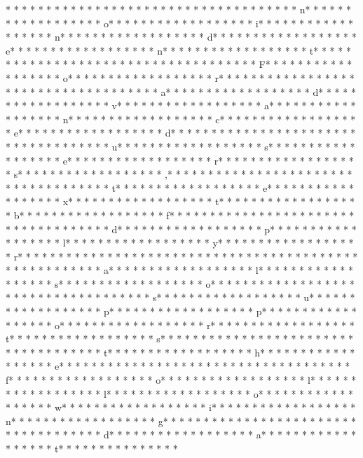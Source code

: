 * * *  * * *  * * *  *  * * *  *  * * *  * 	* * *  * * *  * * *  *  * * *  *  * * *  * n* * *  * * *  * * *  *  * * *  *  * * *  * o* * *  * * *  * * *  *  * * *  *  * * *  * i* * *  * * *  * * *  *  * * *  *  * * *  * n* * *  * * *  * * *  *  * * *  *  * * *  * d* * *  * * *  * * *  *  * * *  *  * * *  * e* * *  * * *  * * *  *  * * *  *  * * *  * n* * *  * * *  * * *  *  * * *  *  * * *  * t* * *  * * *  * * *  *  * * *  *  * * *  *  * * *  * * *  * * *  *  * * *  *  * * *  * F* * *  * * *  * * *  *  * * *  *  * * *  * o* * *  * * *  * * *  *  * * *  *  * * *  * r* * *  * * *  * * *  *  * * *  *  * * *  *  * * *  * * *  * * *  *  * * *  *  * * *  * a* * *  * * *  * * *  *  * * *  *  * * *  * d* * *  * * *  * * *  *  * * *  *  * * *  * v* * *  * * *  * * *  *  * * *  *  * * *  * a* * *  * * *  * * *  *  * * *  *  * * *  * n* * *  * * *  * * *  *  * * *  *  * * *  * c* * *  * * *  * * *  *  * * *  *  * * *  * e* * *  * * *  * * *  *  * * *  *  * * *  * d* * *  * * *  * * *  *  * * *  *  * * *  *  * * *  * * *  * * *  *  * * *  *  * * *  * u* * *  * * *  * * *  *  * * *  *  * * *  * s* * *  * * *  * * *  *  * * *  *  * * *  * e* * *  * * *  * * *  *  * * *  *  * * *  * r* * *  * * *  * * *  *  * * *  *  * * *  * s* * *  * * *  * * *  *  * * *  *  * * *  * ,* * *  * * *  * * *  *  * * *  *  * * *  *  * * *  * * *  * * *  *  * * *  *  * * *  * t* * *  * * *  * * *  *  * * *  *  * * *  * e* * *  * * *  * * *  *  * * *  *  * * *  * x* * *  * * *  * * *  *  * * *  *  * * *  * t* * *  * * *  * * *  *  * * *  *  * * *  * b* * *  * * *  * * *  *  * * *  *  * * *  * f* * *  * * *  * * *  *  * * *  *  * * *  * {* * *  * * *  * * *  *  * * *  *  * * *  * d* * *  * * *  * * *  *  * * *  *  * * *  * p* * *  * * *  * * *  *  * * *  *  * * *  * l* * *  * * *  * * *  *  * * *  *  * * *  * y* * *  * * *  * * *  *  * * *  *  * * *  * r* * *  * * *  * * *  *  * * *  *  * * *  * }* * *  * * *  * * *  *  * * *  *  * * *  *  * * *  * * *  * * *  *  * * *  *  * * *  * a* * *  * * *  * * *  *  * * *  *  * * *  * l* * *  * * *  * * *  *  * * *  *  * * *  * s* * *  * * *  * * *  *  * * *  *  * * *  * o* * *  * * *  * * *  *  * * *  *  * * *  *  * * *  * * *  * * *  *  * * *  *  * * *  * s* * *  * * *  * * *  *  * * *  *  * * *  * u* * *  * * *  * * *  *  * * *  *  * * *  * p* * *  * * *  * * *  *  * * *  *  * * *  * p* * *  * * *  * * *  *  * * *  *  * * *  * o* * *  * * *  * * *  *  * * *  *  * * *  * r* * *  * * *  * * *  *  * * *  *  * * *  * t* * *  * * *  * * *  *  * * *  *  * * *  * s* * *  * * *  * * *  *  * * *  *  * * *  *  * * *  * * *  * * *  *  * * *  *  * * *  * t* * *  * * *  * * *  *  * * *  *  * * *  * h* * *  * * *  * * *  *  * * *  *  * * *  * e* * *  * * *  * * *  *  * * *  *  * * *  *  * * *  * * *  * * *  *  * * *  *  * * *  * f* * *  * * *  * * *  *  * * *  *  * * *  * o* * *  * * *  * * *  *  * * *  *  * * *  * l* * *  * * *  * * *  *  * * *  *  * * *  * l* * *  * * *  * * *  *  * * *  *  * * *  * o* * *  * * *  * * *  *  * * *  *  * * *  * w* * *  * * *  * * *  *  * * *  *  * * *  * i* * *  * * *  * * *  *  * * *  *  * * *  * n* * *  * * *  * * *  *  * * *  *  * * *  * g* * *  * * *  * * *  *  * * *  *  * * *  *  * * *  * * *  * * *  *  * * *  *  * * *  * d* * *  * * *  * * *  *  * * *  *  * * *  * a* * *  * * *  * * *  *  * * *  *  * * *  * t* * *  * * *  * * *  *  * * *  *  * 